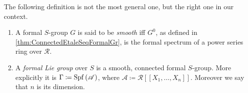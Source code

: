 \noindent
The following definition is not the most general one, but
the right one in our context.
\begin{defn}\leavevmode\vspace{-1\baselineskip}
\label{defn:FormalSchemeFormalLieGroup}
\begin{enumerate}
	\item A formal $S$-group $G$ is said to be \emph{smooth} iff
		$G^0$, as defined in \cref{thm:ConnectedEtaleSeqFormalGr},
		is the formal spectrum of a power series ring over $\mathscr{R}$.
	\item A \emph{formal Lie group} over $S$ is a smooth, connected formal $S$-group.
		More explicitly it is $\Gamma \coloneqq \operatorname{Spf}\left( \mathscr{A} \right)$,
		where $\mathscr{A} \coloneqq \mathscr{R} [\![ X_1, \ldots, X_{ n } ]\!]$.
		Moreover we say that $n$ is its dimension. 
\end{enumerate}
\end{defn}


